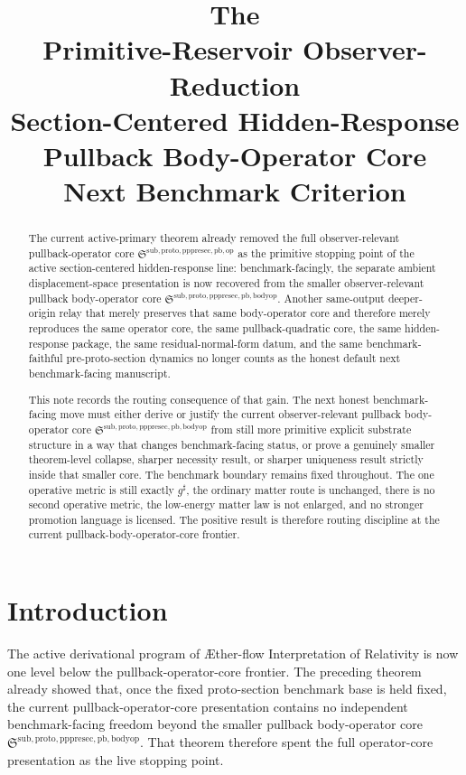 \documentclass[11pt]{article}
\title{\textbf{The \TheoryName{}}\\[0.4em]
\large Primitive-Reservoir Observer-Reduction\\
\large Section-Centered Hidden-Response\\
\large Pullback Body-Operator Core\\
\large Next Benchmark Criterion}
\author{}
\date{}
\newcommand{\Aflow}{\AE{}ther-flow}
\newcommand{\TheoryName}{\Aflow{} Interpretation of Relativity}
\newcommand{\CompletedMetric}{g^{\sharp}}
\newcommand{\PullbackOperatorCore}{\mathfrak S^{\mathrm{sub,proto,pppresec,pb,op}}}
\newcommand{\PullbackBodyOperatorCore}{\mathfrak S^{\mathrm{sub,proto,pppresec,pb,bodyop}}}
\begin{document}
\maketitle

\begin{abstract}
The current active-primary theorem already removed the full observer-relevant pullback-operator core \(\PullbackOperatorCore\) as the primitive stopping point of the active section-centered hidden-response line: benchmark-facingly, the separate ambient displacement-space presentation is now recovered from the smaller observer-relevant pullback body-operator core \(\PullbackBodyOperatorCore\). Another same-output deeper-origin relay that merely preserves that same body-operator core and therefore merely reproduces the same operator core, the same pullback-quadratic core, the same hidden-response package, the same residual-normal-form datum, and the same benchmark-faithful pre-proto-section dynamics no longer counts as the honest default next benchmark-facing manuscript.

This note records the routing consequence of that gain. The next honest benchmark-facing move must either derive or justify the current observer-relevant pullback body-operator core \(\PullbackBodyOperatorCore\) from still more primitive explicit substrate structure in a way that changes benchmark-facing status, or prove a genuinely smaller theorem-level collapse, sharper necessity result, or sharper uniqueness result strictly inside that smaller core. The benchmark boundary remains fixed throughout. The one operative metric is still exactly \(\CompletedMetric\), the ordinary matter route is unchanged, there is no second operative metric, the low-energy matter law is not enlarged, and no stronger promotion language is licensed. The positive result is therefore routing discipline at the current pullback-body-operator-core frontier.
\end{abstract}

\section{Introduction}

The active derivational program of \TheoryName{} is now one level below the pullback-operator-core frontier. The preceding theorem already showed that, once the fixed proto-section benchmark base is held fixed, the current pullback-operator-core presentation contains no independent benchmark-facing freedom beyond the smaller pullback body-operator core \(\PullbackBodyOperatorCore\). That theorem therefore spent the full operator-core presentation as the live stopping point.
\end{document}
